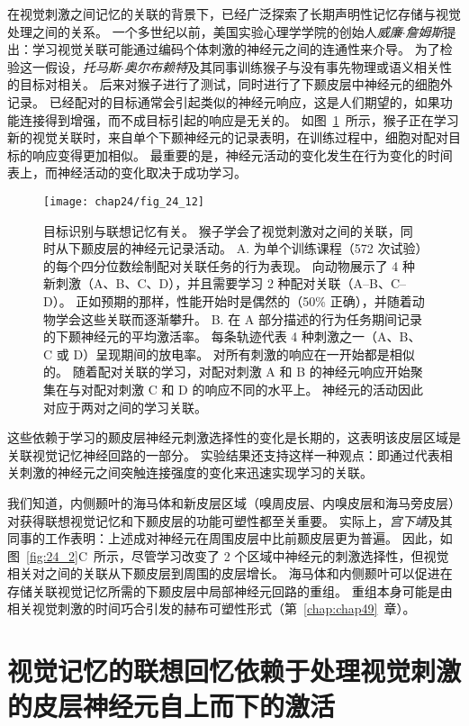 在视觉刺激之间记忆的关联的背景下，已经广泛探索了长期声明性记忆存储与视觉处理之间的关系。
一个多世纪以前，美国实验心理学学院的创始人\textit{威廉$\cdot$詹姆斯}提出：学习视觉关联可能通过编码个体刺激的神经元之间的连通性来介导。
为了检验这一假设，\textit{托马斯$\cdot$奥尔布赖特}及其同事训练猴子与没有事先物理或语义相关性的目标对相关。
后来对猴子进行了测试，同时进行了下颞皮层中神经元的细胞外记录。
已经配对的目标通常会引起类似的神经元响应，这是人们期望的，如果功能连接得到增强，而不成目标引起的响应是无关的。
如图~\ref{fig:24_12}~所示，猴子正在学习新的视觉关联时，来自单个下颞神经元的记录表明，在训练过程中，细胞对配对目标的响应变得更加相似。
最重要的是，神经元活动的变化发生在行为变化的时间表上，而神经活动的变化取决于成功学习。


\begin{figure}[htbp]
	\centering
	\texttt{[image: chap24/fig\_24\_12]}
	\caption{目标识别与联想记忆有关。
		猴子学会了视觉刺激对之间的关联，同时从下颞皮层的神经元记录活动。
		A. 为单个训练课程（572 次试验）的每个四分位数绘制配对关联任务的行为表现。
		向动物展示了 4 种新刺激（A、B、C、D），并且需要学习 2 种配对关联（A–B、C–D）。
		正如预期的那样，性能开始时是偶然的（50\% 正确），并随着动物学会这些关联而逐渐攀升。
		B. 在 A 部分描述的行为任务期间记录的下颞神经元的平均激活率。
		每条轨迹代表 4 种刺激之一（A、B、C 或 D）呈现期间的放电率。
		对所有刺激的响应在一开始都是相似的。
		随着配对关联的学习，对配对刺激 A 和 B 的神经元响应开始聚集在与对配对刺激 C 和 D 的响应不同的水平上。
		神经元的活动因此对应于两对之间的学习关联。}
	\label{fig:24_12}
\end{figure}


这些依赖于学习的颞皮层神经元刺激选择性的变化是长期的，这表明该皮层区域是关联视觉记忆神经回路的一部分。
实验结果还支持这样一种观点：即通过代表相关刺激的神经元之间突触连接强度的变化来迅速实现学习的关联。


我们知道，内侧颞叶的海马体和新皮层区域（嗅周皮层、内嗅皮层和海马旁皮层）对获得联想视觉记忆和下颞皮层的功能可塑性都至关重要。
实际上，\textit{宫下靖}及其同事的工作表明：上述成对神经元在周围皮层中比前颞皮层更为普遍\cite{miyashita1993inferior}。
因此，如图~\ref{fig:24_2}C~所示，尽管学习改变了 2 个区域中神经元的刺激选择性，但视觉相关对之间的关联从下颞皮层到周围的皮层增长。
海马体和内侧颞叶可以促进在存储关联视觉记忆所需的下颞皮层中局部神经元回路的重组。
重组本身可能是由相关视觉刺激的时间巧合引发的赫布可塑性形式（第~\ref{chap:chap49}~章）。



\section{视觉记忆的联想回忆依赖于处理视觉刺激的皮层神经元自上而下的激活}

